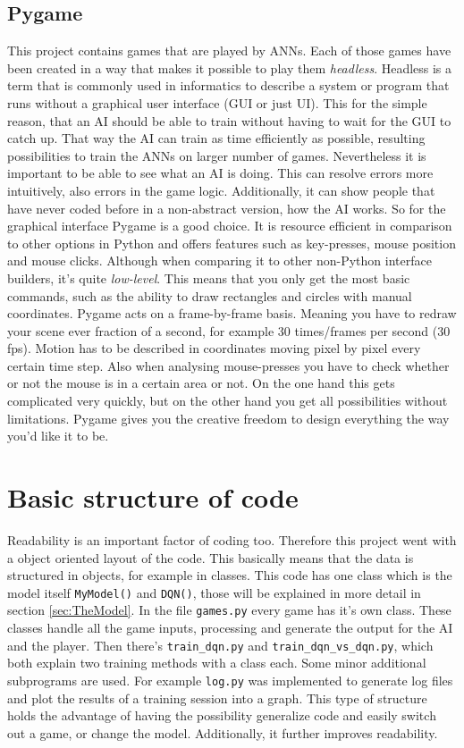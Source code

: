 \documentclass[12pt]{article}
\begin{document}
\subsection{Pygame}
This project contains games that are played by ANNs. Each of those games have been created in a way that makes it possible to play them \textit{headless}. Headless is a term that is commonly used in informatics to describe a system or program that runs without a graphical user interface (GUI or just UI). This for the simple reason, that an AI should be able to train without having to wait for the GUI to catch up. That way the AI can train as time efficiently as possible, resulting possibilities to train the ANNs on larger number of games. Nevertheless it is important to be able to see what an AI is doing. This can resolve errors more intuitively, also errors in the game logic. Additionally, it can show people that have never coded before in a non-abstract version, how the AI works. So for the graphical interface Pygame is a good choice. It is resource efficient in comparison to other options in Python and offers features such as key-presses, mouse position and mouse clicks. Although when comparing it to other non-Python interface builders, it's quite \textit{low-level}. This means that you only get the most basic commands, such as the ability to draw rectangles and circles with manual coordinates. Pygame acts on a frame-by-frame basis. Meaning you have to redraw your scene ever fraction of a second, for example 30 times/frames per second (30 fps). Motion has to be described in coordinates moving pixel by pixel every certain time step. Also when analysing mouse-presses you have to check whether or not the mouse is in a certain area or not. On the one hand this gets complicated very quickly, but on the other hand you get all possibilities without limitations. Pygame gives you the creative freedom to design everything the way you'd like it to be. \cite{PyGame}
\section{Basic structure of code}
Readability is an important factor of coding too. Therefore this project went with a object oriented layout of the code. This basically means that the data is structured in objects, for example in classes. This code has one class which is the model itself \lstinline{MyModel()} and \lstinline{DQN()}, those will be explained in more detail in section \ref{sec:TheModel}. In the file \lstinline{games.py} every game has it's own class. These classes handle all the game inputs, processing and generate the output for the AI and the player. Then there's \lstinline{train_dqn.py} and \lstinline{train_dqn_vs_dqn.py}, which both explain two training methods with a class each. Some minor additional subprograms are used. For example \lstinline{log.py} was implemented to generate log files and plot the results of a training session into a graph. This type of structure holds the advantage of having the possibility generalize code and easily switch out a game, or change the model. Additionally, it further improves readability.
\end{document}
